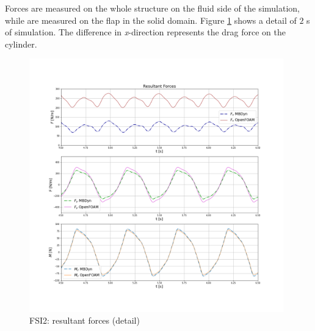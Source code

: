 Forces are measured on the whole structure on the fluid side of the simulation, while are measured on the flap in the solid domain. Figure \ref{fig:FSI2_force} shows a detail of $2$ \si{s} of simulation. The difference in \textit{x}-direction represents the drag force on the cylinder.
\begin{figure}[htbp!]
	\centering
	\includegraphics[width=0.98\textwidth, trim=20 100 20 100, clip]{images/FSI2/forces_fsi2.png}
	\caption{FSI2: resultant forces (detail)}
	\label{fig:FSI2_force}
\end{figure}


